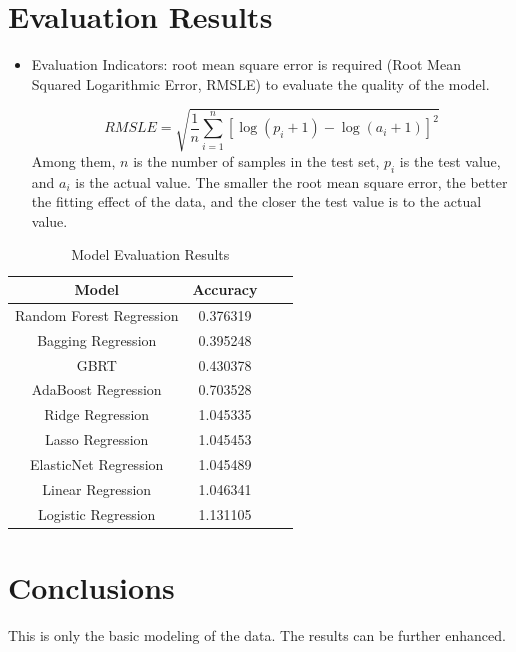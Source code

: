 \section{Evaluation Results} \label{sec-result}
\begin{itemize}

  \item Evaluation Indicators: root mean square error is required (Root Mean Squared Logarithmic Error, RMSLE) to evaluate the quality of the model. 
  \smallskip
  
  {$$ RMSLE = \sqrt{\frac{1}{n} \sum_{i=1}^n [\log(p_i + 1) - \log(a_i + 1)]^2} $$}
  Among them, $n$ is the number of samples in the test set, $p_i$ is the test value, and $a_i$ is the actual value. The smaller the root mean square error, the better the fitting effect of the data, and the closer the test value is to the actual value.
  \end{itemize}

  \begin{table}[tb]
    \setlength{\abovecaptionskip}{0pt}
    \setlength{\belowcaptionskip}{10pt}
    \centering
    \caption{Model Evaluation Results}
    
    \begin{tabular}{ c | c | c | c }
    \toprule
      Model     & Accuracy      \\
    \midrule
    Random Forest Regression        & 0.376319   \\
    Bagging Regression              & 0.395248    \\
    GBRT                            & 0.430378   \\
    AdaBoost Regression             & 0.703528   \\ 
    Ridge Regression                & 1.045335   \\
    Lasso Regression                & 1.045453 \\
    ElasticNet Regression           & 1.045489 \\
    Linear Regression               & 1.046341 \\
    Logistic Regression             & 1.131105 \\
    \bottomrule
    \end{tabular}
    \end{table}

\section{Conclusions} \label{sec-conclusions}

This is only the basic modeling of the data. The results can be further enhanced.





